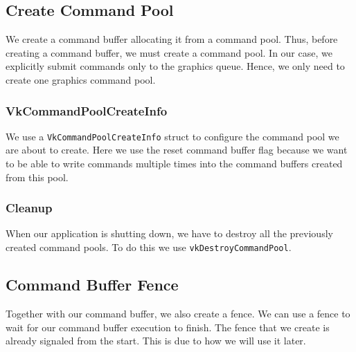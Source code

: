 \subsection{Create Command Pool}

We create a command buffer allocating it from a command pool.
Thus, before creating a command buffer, we must create a command pool.
In our case, we explicitly submit commands only to the graphics queue.
Hence, we only need to create one graphics command pool.

\begin{minipage}{\linewidth}{\noindent}
    
\end{minipage}

\subsubsection{VkCommandPoolCreateInfo}

We use a \texttt{VkCommandPoolCreateInfo} struct to configure the command pool we are
about to create.
Here we use the reset command buffer flag because we want to be able to
write commands multiple times into the command buffers created from this pool.

\begin{minipage}{\linewidth}{\noindent}
    
\end{minipage}

\subsubsection{Cleanup}

When our application is shutting down, we have to destroy all the previously created
command pools.
To do this we use \texttt{vkDestroyCommandPool}.

\subsection{Command Buffer Fence}

Together with our command buffer, we also create a fence.
We can use a fence to wait for our command buffer execution to finish.
The fence that we create is already signaled from the start.
This is due to how we will use it later.

